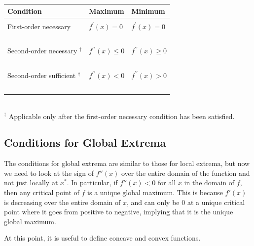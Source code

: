 \documentclass{./../../latex/handout}
\begin{document}
\begin{tabularx}{\textwidth}{lXX}
\hline Condition & Maximum & Minimum \\
\hline \\ 
First-order necessary & $f^{\prime}(x)=0$ & $f^{\prime}(x)=0$ \\~\\
Second-order necessary ${ }^{\dagger}$ & $f^{\prime \prime}(x) \leq 0$ & $f^{\prime \prime}(x) \geq 0$ \\~\\
Second-order sufficient ${ }^{\dagger}$ & $f^{\prime \prime}(x)<0$ & $f^{\prime \prime}(x)>0$ \\~\\
\hline
\end{tabularx} \\
${ }^{\dagger}$ Applicable only after the first-order necessary condition has been satisfied.
\vspace{0.25em}


\subsection{Conditions for Global Extrema}
The conditions for global extrema are similar to those for local extrema, but now we need to look at the sign of $f''(x)$ over the entire domain of the function and not just locally at $x^*$. In particular, if $f''(x)<0$ for all $x$ in the domain of $f$, then any critical point of $f$ is a unique global maximum. This is because $f'(x)$ is decreasing over the entire domain of $x$, and can only be 0 at a unique critical point where it goes from positive to negative, implying that it is the unique global maximum. 

At this point, it is useful to define concave and convex functions. \\

 \\
\end{document}

